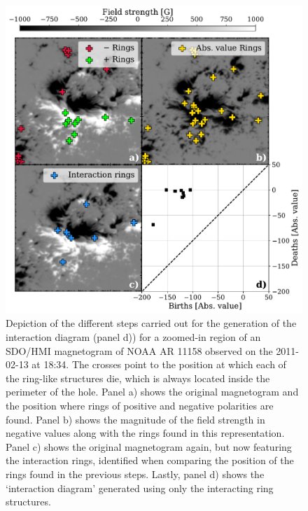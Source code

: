 \begin{figure}
  \begin{minipage}[c]{0.5\textwidth}
    \includegraphics[width=\textwidth]{figures/PersistentHomology/InteractingDiagram.pdf}
  \end{minipage}\hfill
  \begin{minipage}[c]{0.5\textwidth}
    \caption{
      Depiction of the different steps carried out for the generation of the interaction diagram (panel d)) for a zoomed-in region of an SDO/HMI magnetogram of NOAA AR 11158 observed on the 2011-02-13 at 18:34. The crosses point to the position at which each of the ring-like structures die, which is always located inside the perimeter of the hole. Panel a) shows the original magnetogram and the position where rings of positive and negative polarities are found. Panel b) shows the magnitude of the field strength in negative values along with the rings found in this representation. Panel c) shows the original magnetogram again, but now featuring the interaction rings, identified when comparing the position of the rings found in the previous steps. Lastly, panel d) shows the `interaction diagram' generated using only the interacting ring structures.
    } \label{fig: Interacting_diagram}
  \end{minipage}
\end{figure}

